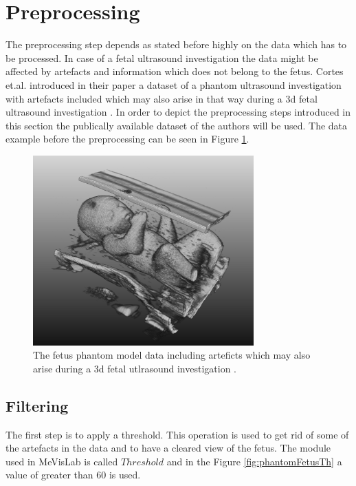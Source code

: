 \newpage
\section{Preprocessing}

The preprocessing step depends as stated before highly on the data which has to be processed. In case of a fetal ultrasound investigation the data might be affected by artefacts and information which does not belong to the fetus. Cortes et.al. introduced in their paper a dataset of a phantom ultrasound investigation with artefacts included which may also arise in that way during a \gls{3d} fetal ultrasound investigation \cite{Cortes2016UltrasoundEvaluation}. In order to depict the preprocessing steps introduced in this section the publically available dataset of the authors will be used. The data example before the preprocessing can be seen in Figure \ref{fig:phantomFetusOr}.

\begin{figure} [!htb]
    \centering
	\includegraphics[width=8.5cm]{content/images/phantomFetusOr}
	\caption{The fetus phantom model data including arteficts which may also arise during a \gls{3d} fetal utlrasound investigation \cite{Cortes2016UltrasoundEvaluation}.} 
	\label{fig:phantomFetusOr}
\end{figure}

\newpage
\subsection{Filtering}

The first step is to apply a threshold. This operation is used to get rid of some of the artefacts in the data and to have a cleared view of the fetus. The module used in MeVisLab is called $Threshold$ and in the Figure \ref{fig:phantomFetusTh} a value of greater than 60 is used.

